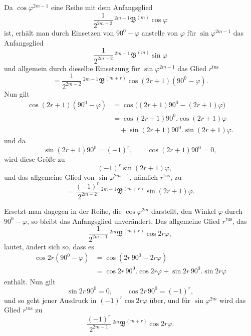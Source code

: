 \par\noindent{}%
\hspace*{\parindent}Da $\cos\varphi^{2m-1}$ eine Reihe mit dem Anfangsglied
\[
\frac{1}{2^{2m-2}}\,{}^{2m-1}\mathfrak{B}^{(m)}\cos\varphi
\]
ist, erhält man durch Einsetzen von $90^0-\varphi$ anstelle von $\varphi$ für $\sin\varphi^{2m-1}$ das Anfangsglied
\[
\frac{1}{2^{2m-2}}\,{}^{2m-1}\mathfrak{B}^{(m)}\sin\varphi
\]
und allgemein durch dieselbe Einsetzung für $\sin\varphi^{2m-1}$ das Glied $r^{\text{tus}}$
\[
= \frac{1}{2^{2m-2}}\,{}^{2m-1}\mathfrak{B}^{(m+r)}\cos(2r+1)(90^0-\varphi).
\]
Nun gilt
\[
\begin{aligned}
\cos(2r+1)(90^0-\varphi) &= \cos\big((2r+1)90^0 - (2r+1)\varphi\big)\\
&= \cos(2r+1)90^0 . \cos(2r+1)\varphi\\&\quad + \sin(2r+1)90^0 . \sin(2r+1)\varphi.
\end{aligned}
\]
und da
\[
\sin(2r+1)90^0 = (-1)^r, \qquad \cos(2r+1)90^0 = 0,
\]
wird diese Größe zu
\[
= (-1)^r\sin(2r+1)\varphi,
\]
und das allgemeine Glied von $\sin\varphi^{2m-1}$, nämlich $r^{\text{tus}}$, zu
\[
= \frac{(-1)^r}{2^{2m-2}}\,{}^{2m-1}\mathfrak{B}^{(m+r)}\sin(2r+1)\varphi.
\]

Ersetzt man dagegen in der Reihe, die $\cos\varphi^{2m}$ darstellt, den Winkel $\varphi$ durch $90^0-\varphi$, so bleibt das Anfangsglied unverändert. Das allgemeine Glied $r^{\text{tus}}$, das
\[
\frac{1}{2^{2m-1}}\,{}^{2m}\mathfrak{B}^{(m+r)}\cos 2r\varphi,
\]
lautet, ändert sich so, dass es
\[
\begin{aligned}
\cos 2r(90^0-\varphi) &= \cos(2r\,90^0 - 2r\varphi)\\
&= \cos 2r\,90^0 . \cos 2r\varphi + \sin 2r\,90^0 . \sin 2r\varphi
\end{aligned}
\]
enthält. Nun gilt
\[
\sin 2r\,90^0 = 0, \qquad \cos 2r\,90^0 = (-1)^r,
\]
und so geht jener Ausdruck in $(-1)^r\cos 2r\varphi$ über, und für $\sin\varphi^{2m}$ wird das Glied $r^{\text{tus}}$ zu
\[
\frac{(-1)^r}{2^{2m-1}}\,{}^{2m}\mathfrak{B}^{(m+r)}\cos 2r\varphi.
\]
